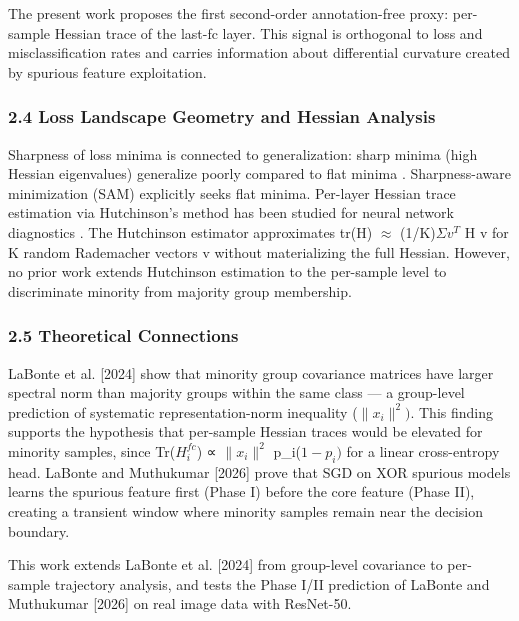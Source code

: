 The present work proposes the first second-order annotation-free proxy: per-sample Hessian trace of the last-fc layer. This signal is orthogonal to loss and misclassification rates and carries information about differential curvature created by spurious feature exploitation.

\subsubsection{2.4 Loss Landscape Geometry and Hessian Analysis}

Sharpness of loss minima is connected to generalization: sharp minima (high Hessian eigenvalues) generalize poorly compared to flat minima \citep{keskar2016large}. Sharpness-aware minimization (SAM) \citep{foret2021sharpnessaware} explicitly seeks flat minima. Per-layer Hessian trace estimation via Hutchinson's method has been studied for neural network diagnostics \citep{yao2020pyhessian}. The Hutchinson estimator approximates tr(H) $\approx$ (1/K)$\Sigma v^T$ H v for K random Rademacher vectors v without materializing the full Hessian. However, no prior work extends Hutchinson estimation to the per-sample level to discriminate minority from majority group membership.

\subsubsection{2.5 Theoretical Connections}

LaBonte et al. [2024] show that minority group covariance matrices have larger spectral norm than majority groups within the same class --- a group-level prediction of systematic representation-norm inequality ($\|x_{i}\|^{2})$. This finding supports the hypothesis that per-sample Hessian traces would be elevated for minority samples, since Tr($H_i^{fc}$) ∝ $\|x_{i}\|^2$ p\_i($1-p_{i})$ for a linear cross-entropy head. LaBonte and Muthukumar [2026] prove that SGD on XOR spurious models learns the spurious feature first (Phase I) before the core feature (Phase II), creating a transient window where minority samples remain near the decision boundary.

This work extends LaBonte et al. [2024] from group-level covariance to per-sample trajectory analysis, and tests the Phase I/II prediction of LaBonte and Muthukumar [2026] on real image data with ResNet-50.
